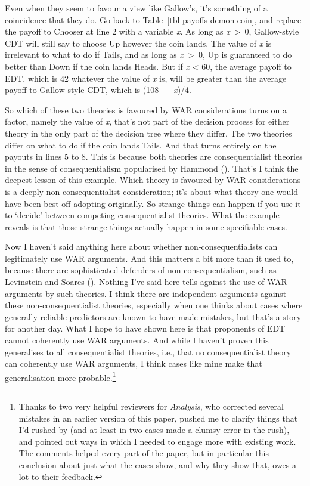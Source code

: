 \documentclass[
  11pt,
  letterpaper,
  DIV=11,
  numbers=noendperiod,
  twoside]{scrartcl}
\begin{document}
Even when they seem to favour a view like Gallow's, it's something of a
coincidence that they do. Go back to Table~\ref{tbl-payoffs-demon-coin},
and replace the payoff to Chooser at line 2 with a variable \emph{x}. As
long as \emph{x}~\textgreater~0, Gallow-style CDT will still say to
choose Up however the coin lands. The value of \emph{x} is irrelevant to
what to do if Tails, and as long as \emph{x}~\textgreater~0, Up is
guaranteed to do better than Down if the coin lands Heads. But if
\emph{x} \textless{} 60, the average payoff to EDT, which is 42 whatever
the value of \emph{x} is, will be greater than the average payoff to
Gallow-style CDT, which is (108~+~\emph{x})/4.

So which of these two theories is favoured by WAR considerations turns
on a factor, namely the value of \emph{x}, that's not part of the
decision process for either theory in the only part of the decision tree
where they differ. The two theories differ on what to do if the coin
lands Tails. And that turns entirely on the payouts in lines 5 to 8.
This is because both theories are consequentialist theories in the sense
of consequentialism popularised by Hammond
(). That's I think the deepest lesson of
this example. Which theory is favoured by WAR considerations is a deeply
non-consequentialist consideration; it's about what theory one would
have been best off adopting originally. So strange things can happen if
you use it to `decide' between competing consequentialist theories. What
the example reveals is that those strange things actually happen in some
specifiable cases.

Now I haven't said anything here about whether non-consequentialists can
legitimately use WAR arguments. And this matters a bit more than it used
to, because there are sophisticated defenders of non-consequentialism,
such as Levinstein and Soares
(). Nothing I've said here
tells against the use of WAR arguments by such theories. I think there
are independent arguments against these non-consequentialist theories,
especially when one thinks about cases where generally reliable
predictors are known to have made mistakes, but that's a story for
another day. What I hope to have shown here is that proponents of EDT
cannot coherently use WAR arguments. And while I haven't proven this
generalises to all consequentialist theories, i.e., that no
consequentialist theory can coherently use WAR arguments, I think cases
like mine make that generalisation more probable.\footnote{Thanks to two
  very helpful reviewers for \emph{Analysis}, who corrected several
  mistakes in an earlier version of this paper, pushed me to clarify
  things that I'd rushed by (and at least in two cases made a clumsy
  error in the rush), and pointed out ways in which I needed to engage
  more with existing work. The comments helped every part of the paper,
  but in particular this conclusion about just what the cases show, and
  why they show that, owes a lot to their feedback.}
\end{document}

